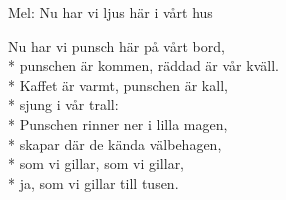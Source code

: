 \begin{SongText}
    \begin{SongInfo}
        Mel: Nu har vi ljus här i vårt hus
    \end{SongInfo}
    \begin{SongVerse}
        Nu har vi punsch här på vårt bord,\\*%
        punschen är kommen, räddad är vår kväll.\\*%
        Kaffet är varmt, punschen är kall,\\*%
        sjung i vår trall:\\*%
        Punschen rinner ner i lilla magen,\\*%
        skapar där de kända välbehagen,\\*%
        som vi gillar, som vi gillar,\\*%
        ja, som vi gillar till tusen.
    \end{SongVerse}\end{SongText}
